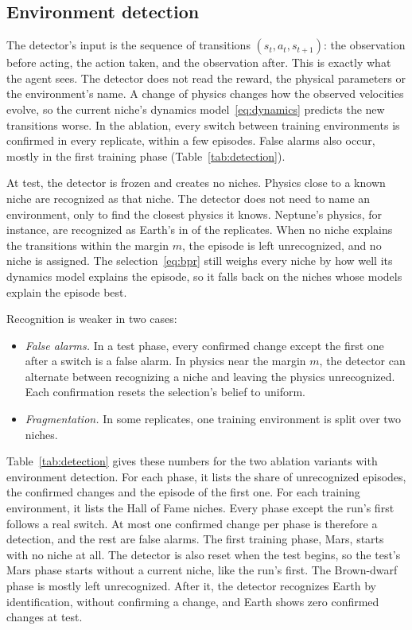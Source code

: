 \subsection{Environment detection}
\label{sec:appendix_detection}
The detector's input is the sequence of transitions $(s_t, a_t, s_{t+1})$: the observation before acting, the action taken, and the observation after. This is exactly what the agent sees. The detector does not read the reward, the physical parameters or the environment's name. A change of physics changes how the observed velocities evolve, so the current niche's dynamics model~\eqref{eq:dynamics} predicts the new transitions worse. In the ablation, every switch between training environments is confirmed in every replicate, within a few episodes. False alarms also occur, mostly in the first training phase (Table~\ref{tab:detection}).

At test, the detector is frozen and creates no niches. Physics close to a known niche are recognized as that niche. The detector does not need to name an environment, only to find the closest physics it knows. Neptune's physics, for instance, are recognized as Earth's in  of the  replicates. When no niche explains the transitions within the margin $m$, the episode is left unrecognized, and no niche is assigned. The selection~\eqref{eq:bpr} still weighs every niche by how well its dynamics model explains the episode, so it falls back on the niches whose models explain the episode best.

Recognition is weaker in two cases:
\begin{itemize}
\item \textit{False alarms.} In a test phase, every confirmed change except the first one after a switch is a false alarm. In physics near the margin $m$, the detector can alternate between recognizing a niche and leaving the physics unrecognized. Each confirmation resets the selection's belief to uniform.
\item \textit{Fragmentation.} In some replicates, one training environment is split over two niches.
\end{itemize}
Table~\ref{tab:detection} gives these numbers for the two ablation variants with environment detection. For each phase, it lists the share of unrecognized episodes, the confirmed changes and the episode of the first one. For each training environment, it lists the Hall of Fame niches. Every phase except the run's first follows a real switch. At most one confirmed change per phase is therefore a detection, and the rest are false alarms. The first training phase, Mars, starts with no niche at all. The detector is also reset when the test begins, so the test's Mars phase starts without a current niche, like the run's first. The Brown-dwarf phase is mostly left unrecognized. After it, the detector recognizes Earth by identification, without confirming a change, and Earth shows zero confirmed changes at test.

